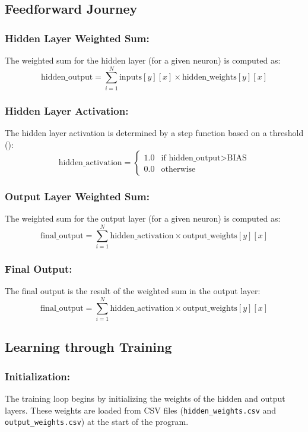 \documentclass{article}
\begin{document}
\subsection{Feedforward Journey}
\subsubsection*{Hidden Layer Weighted Sum:}
The weighted sum for the hidden layer (for a given neuron) is computed as:
\[
\text{{hidden\_output}} = \sum_{i=1}^{N} \text{{inputs}}[y][x] \times \text{{hidden\_weights}}[y][x]
\]
\subsubsection*{Hidden Layer Activation:}
The hidden layer activation is determined by a step function based on a threshold ():
\[
\text{{hidden\_activation}} = \begin{cases}
    1.0 & \text{{if }} \text{{hidden\_output}} > \text{{BIAS}} \\
    0.0 & \text{{otherwise}}
\end{cases}
\]
\subsubsection*{Output Layer Weighted Sum:}
The weighted sum for the output layer (for a given neuron) is computed as:
\[
\text{{final\_output}} = \sum_{i=1}^{N} \text{{hidden\_activation}} \times \text{{output\_weights}}[y][x]
\]
\subsubsection*{Final Output:}
The final output is the result of the weighted sum in the output layer:
\[
\text{{final\_output}} = \sum_{i=1}^{N} \text{{hidden\_activation}} \times \text{{output\_weights}}[y][x]
\]

\subsection{Learning through Training}
\subsubsection*{Initialization:}
The training loop begins by initializing the weights of the hidden and output layers. These weights are loaded from CSV files (\texttt{hidden\_weights.csv} and \texttt{output\_weights.csv}) at the start of the program.
\end{document}
